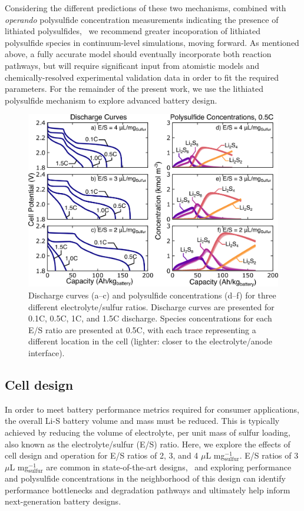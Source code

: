 \documentclass{elsarticle}
\begin{document}
Considering the different predictions of these two mechanisms, combined with \textit{operando} polysulfide concentration measurements indicating the presence of lithiated polysulfides,~\cite{SAQIB2017266} we recommend greater incoporation of lithiated polysulfide species in continuum-level simulations, moving forward. As mentioned above, a fully accurate model should eventually incorporate both reaction pathways, but will require significant input from atomistic models and chemically-resolved experimental validation data in order to fit the required parameters. For the remainder of the present work, we use the lithiated polysulfide mechanism to explore advanced battery design.
\begin{figure}[b!]
    \centering
    \includegraphics[width=\textwidth]{Figures/Figure5_CellDesign.png}
    \caption{Discharge curves (a--c) and polysulfide concentrations (d--f) for three different electrolyte/sulfur ratios. Discharge curves are presented for 0.1C, 0.5C, 1C, and 1.5C discharge. Species concentrations for each E/S ratio are presented at 0.5C, with each trace representing a different location in the cell (lighter: closer to the electrolyte/anode interface).}
    \label{fig:E_S_ratio_comp}
\end{figure}

\subsection{Cell design}
In order to meet battery performance metrics required for consumer applications, the overall Li-S battery volume and mass must be reduced. This is typically achieved by reducing the volume of electrolyte, per unit mass of sulfur loading, also known as the electrolyte/sulfur (E/S) ratio. Here, we explore the effects of cell design and operation for E/S ratios of 2, 3, and 4 $\mu$L mg$^{-1}_\mathrm{sulfur}$. E/S ratios of 3 $\mu$L mg$^{-1}_\mathrm{sulfur}$ are common in state-of-the-art designs,~\cite{Kang2019} and exploring performance and polysulfide concentrations in the neighborhood of this design can identify performance bottlenecks and degradation pathways and ultimately help inform next-generation battery designs.
\end{document}
